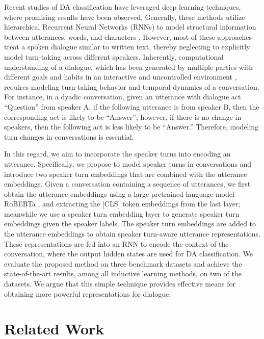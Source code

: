 \documentclass[11pt]{article}
\begin{document}
Recent studies of DA classification have leveraged deep learning techniques, where promising results have been observed. Generally, these methods utilize hierarchical Recurrent Neural Networks (RNNs) to model structural information between utterances, words, and characters \cite{raheja2019dialogue, li2018dual, wan2018improved, chen2018dialogue, kumar2018dialogue, bothe2018context}. However, most of these approaches treat a spoken dialogue similar to written text, thereby neglecting to explicitly model turn-taking across different speakers.
Inherently, computational understanding of a dialogue, which has been generated by multiple parties with different goals and habits in an interactive and uncontrolled environment \cite{chi2017speaker}, requires modeling turn-taking behavior and temporal dynamics of a conversation. For instance, in a dyadic conversation, given an utterance with dialogue act ``Question'' from speaker A, if the following utterance is from speaker B, then the corresponding act is likely to be ``Answer''; however, if there is no change in speakers, then the following act is less likely to be ``Answer.'' Therefore, modeling turn changes in conversations is essential.

In this regard, we aim to incorporate the speaker turns into encoding an utterance.
Specifically, we propose to model speaker turns in conversations and introduce two speaker turn embeddings that are combined with the utterance embeddings.
Given a conversation containing a sequence of utterances, we first obtain the utterance embeddings using a large pretrained language model RoBERTa \cite{liu2019roberta}, and extracting the [CLS] token embeddings from the last layer; meanwhile we use a speaker turn embedding layer to generate speaker turn embeddings given the speaker labels. The speaker turn embeddings are added to the utterance embeddings to obtain speaker turn-aware utterance representations. These representations are fed into an RNN to encode the context of the conversation, where the output hidden states are used for DA classification. We evaluate the proposed method on three benchmark datasets and achieve the state-of-the-art results, among all inductive learning methods, on two of the datasets. We argue that this simple technique provides effective means for obtaining more powerful representations for dialogue.


\section{Related Work}
\end{document}
